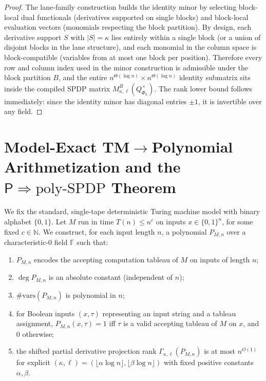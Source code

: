 \documentclass[12pt]{article}
\theoremstyle{definition}
\theoremstyle{definition}
\theoremstyle{remark}
\theoremstyle{remark}
\begin{document}
\begin{proof}
The lane-family construction builds the identity minor by selecting block-local dual functionals
(derivatives supported on single blocks) and block-local evaluation vectors (monomials respecting
the block partition). By design, each derivative support $S$ with $|S|=\kappa$ lies entirely within
a single block (or a union of disjoint blocks in the lane structure), and each monomial in the
column space is block-compatible (variables from at most one block per position). Therefore
every row and column index used in the minor construction is admissible under the block partition
$B$, and the entire $n^{\Theta(\log n)} \times n^{\Theta(\log n)}$ identity submatrix sits inside
the compiled SPDP matrix $M^B_{\kappa,\ell}(Q^{\times}_{\Phi_n})$. The rank lower bound follows
immediately: since the identity minor has diagonal entries $\pm 1$, it is invertible over any field.
\end{proof}


\section{Model-Exact TM$\to$Polynomial Arithmetization and the $\mathsf{P} \Rightarrow \mathrm{poly\text{-}SPDP}$ Theorem}
\label{sec:tm-arithmetization}

We fix the standard, single-tape deterministic Turing machine model with binary alphabet $\{0,1\}$. Let $M$ run in time $T(n) \leq n^c$ on inputs $x \in \{0,1\}^n$, for some fixed $c \in \mathbb{N}$. We construct, for each input length $n$, a polynomial $P_{M,n}$ over a characteristic-$0$ field $\mathbb{F}$ such that:
\begin{enumerate}
\item $P_{M,n}$ encodes the accepting computation tableau of $M$ on inputs of length $n$;
\item $\deg P_{M,n}$ is an absolute constant (independent of $n$);
\item $\#\mathrm{vars}(P_{M,n})$ is polynomial in $n$;
\item for Boolean inputs $(x,\tau)$ representing an input string and a tableau assignment, $P_{M,n}(x,\tau) = 1$ iff $\tau$ is a valid accepting tableau of $M$ on $x$, and $0$ otherwise;
\item the shifted partial derivative projection rank $\Gamma_{\kappa,\ell}(P_{M,n})$ is at most $n^{O(1)}$ for explicit $(\kappa,\ell) = (\lfloor \alpha \log n \rfloor, \lfloor \beta \log n \rfloor)$ with fixed positive constants $\alpha, \beta$.
\end{enumerate}
\end{document}
